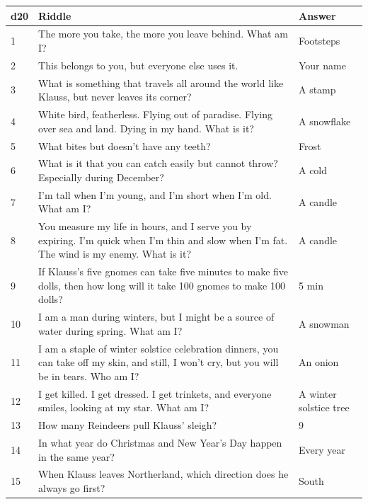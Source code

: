 \documentclass{article}
\begin{document}
	\begin{table}[H]
		\begin{tabular}{|m{2em}|m{35em}|m{10em}|}
			\hline
			\textbf{d20} & \textbf{Riddle} & \textbf{Answer} \\
			\hline
			\hline
			1 & The more you take, the more you leave behind. What am I? & Footsteps \\
			\hline
			2 & This belongs to you, but everyone else uses it. & Your name \\
			\hline
			3 & What is something that travels all around the world like Klauss, but never leaves its corner? & A stamp \\
			\hline
			4 &	White bird, featherless. Flying out of paradise. Flying over sea and land. Dying in my hand. What is it? & A snowflake \\
			\hline
			5 &	What bites but doesn’t have any teeth? & Frost \\
			\hline
		 	6 & What is it that you can catch easily but cannot throw? Especially during December? & A cold \\
		 	\hline
			7 &	I’m tall when I’m young, and I’m short when I’m old. What am I? & A candle \\
			\hline
			8 &	You measure my life in hours, and I serve you by expiring. I'm quick when I'm thin and slow when I'm fat. The wind is my enemy. What is it? & A candle \\
			\hline
			9 &	If Klauss’s five gnomes can take five minutes to make five dolls, then how long will it take 100 gnomes to make 100 dolls? & 5 min \\
			\hline
			10 &	I am a man during winters, but I might be a source of water during spring. What am I? & A snowman \\
			\hline
			11 &	I am a staple of winter solstice celebration dinners, you can take off my skin, and still, I won't cry, but you will be in tears. Who am I? & An onion \\
			\hline
			12 &	I get killed. I get dressed. I get trinkets, and everyone smiles, looking at my star. What am I? &  A winter solstice tree \\
			\hline
			13 &	How many Reindeers pull Klauss' sleigh? & 9 \\
			\hline
			14 & In what year do Christmas and New Year’s Day happen in the same year? & Every year \\
			\hline
			15 &	When Klauss leaves Northerland, which direction does he always go first? & South \\
			\hline

\end{tabular}
\end{table}
\end{document}
